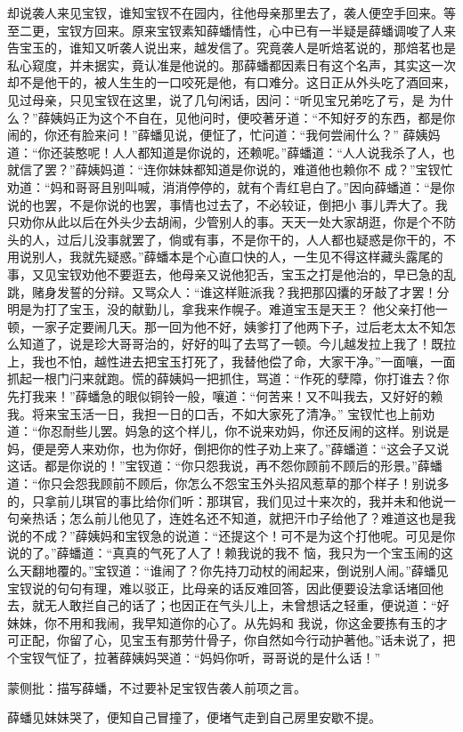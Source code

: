 \begin{parag}
    却说袭人来见宝钗，谁知宝钗不在园内，往他母亲那里去了，袭人便空手回来。等至二更，宝钗方回来。原来宝钗素知薛蟠情性，心中已有一半疑是薛蟠调唆了人来告宝玉的，谁知又听袭人说出来，越发信了。究竟袭人是听焙茗说的，那焙茗也是私心窥度，并未据实，竟认准是他说的。那薛蟠都因素日有这个名声，其实这一次却不是他干的，被人生生的一口咬死是他，有口难分。这日正从外头吃了酒回来，见过母亲，只见宝钗在这里，说了几句闲话，因问：“听见宝兄弟吃了亏，是 为什么？”薛姨妈正为这个不自在，见他问时，便咬著牙道：“不知好歹的东西，都是你闹的，你还有脸来问！”薛蟠见说，便怔了，忙问道：“我何尝闹什么？” 薛姨妈道：“你还装憨呢！人人都知道是你说的，还赖呢。”薛蟠道：“人人说我杀了人，也就信了罢？”薛姨妈道：“连你妹妹都知道是你说的，难道他也赖你不 成？”宝钗忙劝道：“妈和哥哥且别叫喊，消消停停的，就有个青红皂白了。”因向薛蟠道：“是你说的也罢，不是你说的也罢，事情也过去了，不必较证，倒把小 事儿弄大了。我只劝你从此以后在外头少去胡闹，少管别人的事。天天一处大家胡逛，你是个不防头的人，过后儿没事就罢了，倘或有事，不是你干的，人人都也疑惑是你干的，不用说别人，我就先疑惑。”薛蟠本是个心直口快的人，一生见不得这样藏头露尾的事，又见宝钗劝他不要逛去，他母亲又说他犯舌，宝玉之打是他治的，早已急的乱跳，赌身发誓的分辩。又骂众人：“谁这样赃派我？我把那囚攮的牙敲了才罢！分明是为打了宝玉，没的献勤儿，拿我来作幌子。难道宝玉是天王？ 他父亲打他一顿，一家子定要闹几天。那一回为他不好，姨爹打了他两下子，过后老太太不知怎么知道了，说是珍大哥哥治的，好好的叫了去骂了一顿。今儿越发拉上我了！既拉上，我也不怕，越性进去把宝玉打死了，我替他偿了命，大家干净。”一面嚷，一面抓起一根门闩来就跑。慌的薛姨妈一把抓住，骂道：“作死的孽障，你打谁去？你先打我来！”薛蟠急的眼似铜铃一般，嚷道：“何苦来！又不叫我去，又好好的赖我。将来宝玉活一日，我担一日的口舌，不如大家死了清净。” 宝钗忙也上前劝道：“你忍耐些儿罢。妈急的这个样儿，你不说来劝妈，你还反闹的这样。别说是妈，便是旁人来劝你，也为你好，倒把你的性子劝上来了。”薛蟠道：“这会子又说这话。都是你说的！”宝钗道：“你只怨我说，再不怨你顾前不顾后的形景。”薛蟠道：“你只会怨我顾前不顾后，你怎么不怨宝玉外头招风惹草的那个样子！别说多的，只拿前儿琪官的事比给你们听：那琪官，我们见过十来次的，我并未和他说一句亲热话；怎么前儿他见了，连姓名还不知道，就把汗巾子给他了？难道这也是我说的不成？”薛姨妈和宝钗急的说道：“还提这个！可不是为这个打他呢。可见是你说的了。”薛蟠道：“真真的气死了人了！赖我说的我不 恼，我只为一个宝玉闹的这么天翻地覆的。”宝钗道：“谁闹了？你先持刀动杖的闹起来，倒说别人闹。”薛蟠见宝钗说的句句有理，难以驳正，比母亲的话反难回答，因此便要设法拿话堵回他去，就无人敢拦自己的话了；也因正在气头儿上，未曾想话之轻重，便说道：“好妹妹，你不用和我闹，我早知道你的心了。从先妈和 我说，你这金要拣有玉的才可正配，你留了心，见宝玉有那劳什骨子，你自然如今行动护著他。”话未说了，把个宝钗气怔了，拉著薛姨妈哭道：“妈妈你听，哥哥说的是什么话！”\begin{note}蒙侧批：描写薛蟠，不过要补足宝钗告袭人前项之言。\end{note}薛蟠见妹妹哭了，便知自己冒撞了，便堵气走到自己房里安歇不提。
\end{parag}


